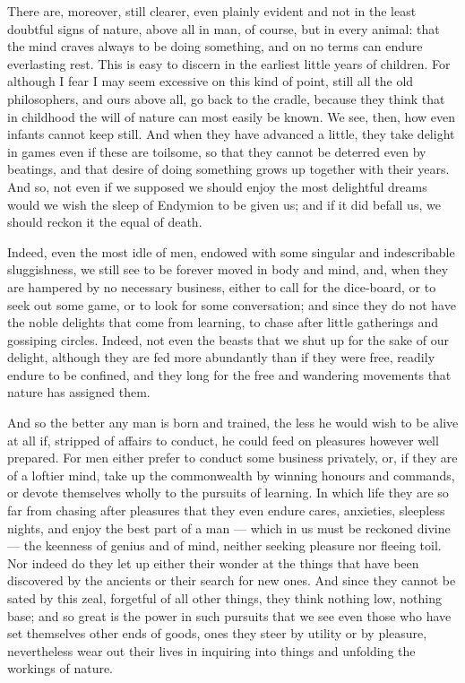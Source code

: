  There are, moreover, still clearer, even plainly evident and not in the least doubtful signs of nature, above all in man, of course, but in every animal: that the mind craves always to be doing something, and on no terms can endure everlasting rest. This is easy to discern in the earliest little years of children. For although I fear I may seem excessive on this kind of point, still all the old philosophers, and ours above all, go back to the cradle, because they think that in childhood the will of nature can most easily be known. We see, then, how even infants cannot keep still. And when they have advanced a little, they take delight in games even if these are toilsome, so that they cannot be deterred even by beatings, and that desire of doing something grows up together with their years. And so, not even if we supposed we should enjoy the most delightful dreams would we wish the sleep of Endymion to be given us; and if it did befall us, we should reckon it the equal of death.

 Indeed, even the most idle of men, endowed with some singular and indescribable sluggishness, we still see to be forever moved in body and mind, and, when they are hampered by no necessary business, either to call for the dice-board, or to seek out some game, or to look for some conversation; and since they do not have the noble delights that come from learning, to chase after little gatherings and gossiping circles. Indeed, not even the beasts that we shut up for the sake of our delight, although they are fed more abundantly than if they were free, readily endure to be confined, and they long for the free and wandering movements that nature has assigned them.

 And so the better any man is born and trained, the less he would wish to be alive at all if, stripped of affairs to conduct, he could feed on pleasures however well prepared. For men either prefer to conduct some business privately, or, if they are of a loftier mind, take up the commonwealth by winning honours and commands, or devote themselves wholly to the pursuits of learning. In which life they are so far from chasing after pleasures that they even endure cares, anxieties, sleepless nights, and enjoy the best part of a man — which in us must be reckoned divine — the keenness of genius and of mind, neither seeking pleasure nor fleeing toil. Nor indeed do they let up either their wonder at the things that have been discovered by the ancients or their search for new ones. And since they cannot be sated by this zeal, forgetful of all other things, they think nothing low, nothing base; and so great is the power in such pursuits that we see even those who have set themselves other ends of goods, ones they steer by utility or by pleasure, nevertheless wear out their lives in inquiring into things and unfolding the workings of nature.

